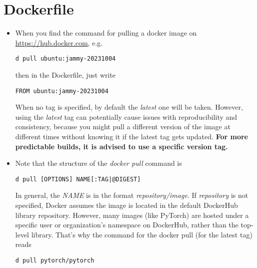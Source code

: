 \documentclass[12pt, a4paper]{scrbook}
\numberwithin{equation}{section}
\theoremstyle{definition}
\theoremstyle{definition}
\begin{document}
	\section{Dockerfile}
	
	\begin{itemize}
		\item When you find the command for pulling a docker image on \url{https://hub.docker.com}, e.g.~
		
		\begin{lstlisting}[style=mystylebash, label=alg:dockerhub, xleftmargin=\parindent]
			d pull ubuntu:jammy-20231004
		\end{lstlisting}
		
		then in the Dockerfile, just write 
		
		\begin{lstlisting}[style=mystylebash, label=alg:dockerfile_from, xleftmargin=\parindent]
			FROM ubuntu:jammy-20231004
		\end{lstlisting}
		
		When no tag is specified, by default the \textit{latest} one will be taken. However, using the \textit{latest} tag can potentially cause issues with reproducibility and consistency, because you might pull a different version of the image at different times without knowing it if the latest tag gets updated. \textbf{For more predictable builds, it is advised to use a specific version tag.}
		
		\item Note that the structure of the \textit{docker pull} command is
		
		\begin{lstlisting}[style=mystylebash, label=alg:docker_pull, xleftmargin=\parindent]
			d pull [OPTIONS] NAME[:TAG|@DIGEST]
		\end{lstlisting}
		
		In general, the \textit{NAME} is in the format \textit{repository/image}. If \textit{repository} is not specified, Docker assumes the image is located in the default DockerHub library repository. However, many images (like PyTorch) are hosted under a specific user or organization's namespace on DockerHub, rather than the top-level library. That's why the command for the docker pull (for the latest tag) reads 
		
		\begin{lstlisting}[style=mystylebash, label=alg:docker_pull_exmp, xleftmargin=\parindent]
			d pull pytorch/pytorch
		\end{lstlisting}
		

\end{itemize}
\end{document}
